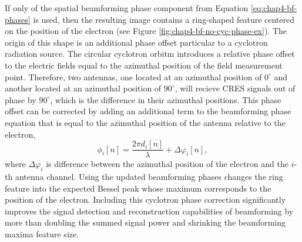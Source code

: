 If only of the spatial beamforming phase component from Equation \ref{eq:chap4-bf-phases} is used, then the resulting image contains a ring-shaped feature centered on the position of the electron (see Figure \ref{fig:chap4-bf-no-cyc-phase-ex}). The origin of this shape is an additional phase offset particular to a cyclotron radiation source. The circular cyclotron orbitm introduces a relative phase offset to the electric fields equal to the azimuthal position of the field measurement point. Therefore, two antennas, one located at an azimuthal position of $0^\circ$ and another located at an azimuthal position of $90^\circ$, will recieve CRES signals out of phase by $90^\circ$, which is the difference in their azimuthal positions. This phase offset can be corrected by adding an additional term to the beamforming phase equation that is equal to the azimuthal position of the antenna relative to the electron, 
\begin{equation}
    \phi_i[n] = \frac{2\pi d_i[n]}{\lambda} + \Delta\varphi_i[n],
\end{equation}
where $\Delta\varphi_i$ is difference between the azimuthal position of the electron and the $i$-th antenna channel. Using the updated beamforming phases changes the ring feature into the expected Bessel peak whose maximum corresponds to the position of the electron. Including this cyclotron phase correction significantly improves the signal detection and reconstruction capabilities of beamforming by more than doubling the summed signal power and shrinking the beamforming maxima feature size. 

